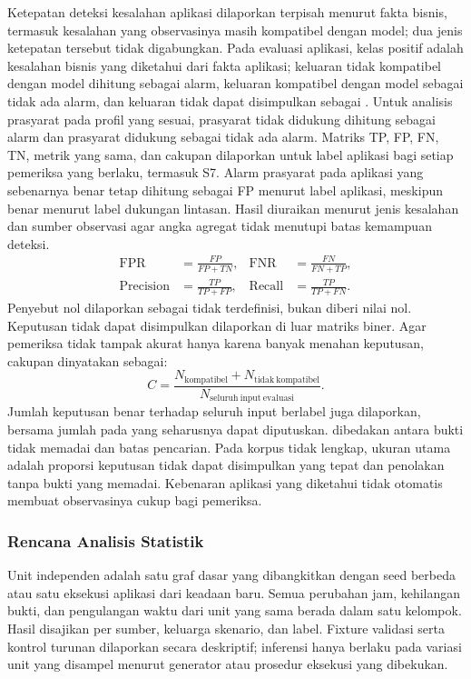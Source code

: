 Ketepatan deteksi kesalahan aplikasi dilaporkan terpisah menurut fakta bisnis, termasuk kesalahan yang observasinya masih kompatibel dengan model; dua jenis ketepatan tersebut tidak digabungkan. Pada evaluasi aplikasi, kelas positif adalah kesalahan bisnis yang diketahui dari fakta aplikasi; keluaran tidak kompatibel dengan model dihitung sebagai alarm, keluaran kompatibel dengan model sebagai tidak ada alarm, dan keluaran tidak dapat disimpulkan sebagai . Untuk analisis prasyarat pada profil yang sesuai, prasyarat tidak didukung dihitung sebagai alarm dan prasyarat didukung sebagai tidak ada alarm. Matriks TP, FP, FN, TN, metrik yang sama, dan cakupan dilaporkan untuk label aplikasi bagi setiap pemeriksa yang berlaku, termasuk S7. Alarm prasyarat pada aplikasi yang sebenarnya benar tetap dihitung sebagai FP menurut label aplikasi, meskipun benar menurut label dukungan lintasan. Hasil diuraikan menurut jenis kesalahan dan sumber observasi agar angka agregat tidak menutupi batas kemampuan deteksi.
\begin{align}
  \operatorname{FPR} &= \frac{FP}{FP+TN}, &
  \operatorname{FNR} &= \frac{FN}{FN+TP}, \\
  \operatorname{Precision} &= \frac{TP}{TP+FP}, &
  \operatorname{Recall} &= \frac{TP}{TP+FN}.
\end{align}
Penyebut nol dilaporkan sebagai tidak terdefinisi, bukan diberi nilai nol. Keputusan tidak dapat disimpulkan dilaporkan di luar matriks biner. Agar pemeriksa tidak tampak akurat hanya karena banyak menahan keputusan, cakupan dinyatakan sebagai:
\begin{equation}
  C=\frac{N_{\mathrm{kompatibel}}+N_{\mathrm{tidak\ kompatibel}}}{N_{\mathrm{seluruh\ input\ evaluasi}}}.
\end{equation}
Jumlah keputusan benar terhadap seluruh input berlabel juga dilaporkan, bersama jumlah  pada  yang seharusnya dapat diputuskan.  dibedakan antara bukti tidak memadai dan batas pencarian. Pada korpus tidak lengkap, ukuran utama adalah proporsi keputusan tidak dapat disimpulkan yang tepat dan penolakan tanpa bukti yang memadai. Kebenaran aplikasi yang diketahui  tidak otomatis membuat observasinya cukup bagi pemeriksa.

\subsubsection{Rencana Analisis Statistik}
\label{sec:statistics}
Unit independen adalah satu graf dasar yang dibangkitkan dengan seed berbeda atau satu eksekusi aplikasi dari keadaan baru. Semua perubahan jam, kehilangan bukti, dan pengulangan waktu dari unit yang sama berada dalam satu kelompok. Hasil disajikan per sumber, keluarga skenario, dan label. Fixture validasi serta kontrol turunan dilaporkan secara deskriptif; inferensi hanya berlaku pada variasi unit yang disampel menurut generator atau prosedur eksekusi yang dibekukan.

